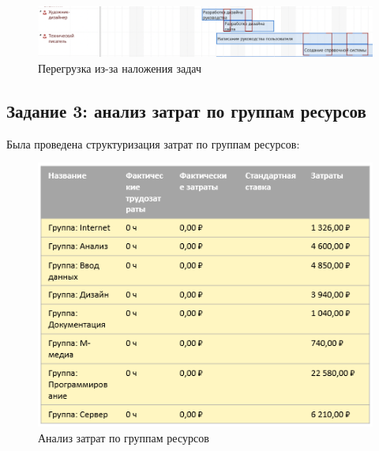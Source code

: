\begin{figure}[h!]
	\begin{center}
		\includegraphics[scale=0.35]{inc/img/p_6.png}
	\end{center}
	\captionsetup{justification=centering}
	\caption{Перегрузка из-за наложения задач}
	\label{fig:u3}
\end{figure}


\newpage

\subsection*{Задание 3: анализ затрат по группам ресурсов}

Была проведена структуризация затрат по группам ресурсов:

\begin{figure}[h!]
	\begin{center}
		\includegraphics[scale=0.9]{inc/img/p_8.jpg}
	\end{center}
	\captionsetup{justification=centering}
	\caption{Анализ затрат по группам ресурсов}
	\label{fig:u3}
\end{figure}

